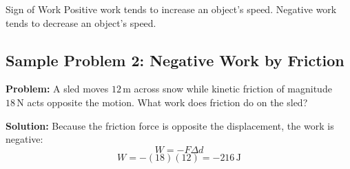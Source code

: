 \begin{keyidea}{Sign of Work}
Positive work tends to increase an object's speed. Negative work tends to decrease an object's speed.
\end{keyidea}

\subsection*{Sample Problem 2: Negative Work by Friction}
\textbf{Problem:} A sled moves $12\,\text{m}$ across snow while kinetic friction of magnitude $18\,\text{N}$ acts opposite the motion. What work does friction do on the sled?

\textbf{Solution:}
Because the friction force is opposite the displacement, the work is negative:
\begin{equation*}
    W = -F \Delta d
\end{equation*}
\begin{equation*}
    W = -(18)(12) = -216\,\text{J}
\end{equation*}

